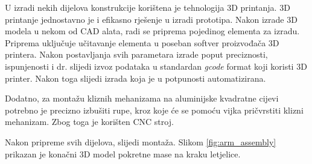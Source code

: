 \documentclass[11pt,a4paper]{article}
\begin{document}
U izradi nekih dijelova konstrukcije korištena je tehnologija 3D printanja. 3D printanje jednostavno je i efikasno rješenje u izradi prototipa. Nakon izrade 3D modela u nekom od CAD alata, radi se priprema pojedinog elementa za izradu. Priprema uključuje učitavanje elementa u poseban softver proizvođača 3D printera. Nakon postavljanja svih parametara izrade poput preciznosti, ispunjenosti i dr. slijedi izvoz podataka u standardan \textit{gcode} format koji koristi 3D printer. Nakon toga slijedi izrada koja je u potpunosti automatizirana.

Dodatno, za montažu kliznih mehanizama na aluminijske kvadratne cijevi potrebno je precizno izbušiti rupe, kroz koje će se pomoću vijka pričvrstiti klizni mehanizam. Zbog toga je korišten CNC stroj.

Nakon pripreme svih dijelova, slijedi montaža. Slikom \ref{fig:arm_assembly} prikazan je konačni 3D model pokretne mase na kraku letjelice.
\end{document}
